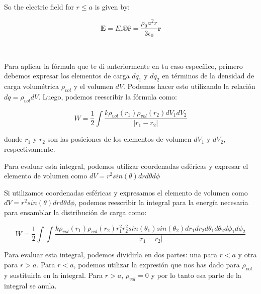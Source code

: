 So the electric field for $r \leq a$ is given by:

$$ \mathbf{E} = E_r®\hat{\mathbf{r}} = \frac{\rho_0 a^2 r}{3 \epsilon_0}\hat{\mathbf{r}} $$

------------------------------------


Para aplicar la fórmula que te di anteriormente en tu caso específico, primero debemos expresar los elementos de carga $dq_1$ y $dq_2$ en términos de la densidad de carga volumétrica $\rho_{vol}$ y el volumen $dV$. Podemos hacer esto utilizando la relación $dq = \rho_{vol} dV$. Luego, podemos reescribir la fórmula como:

$$ W = \frac{1}{2} \int \frac{k \rho_{vol}(r_1) \rho_{vol}(r_2) dV_1 dV_2}{|r_1 - r_2|} $$

donde $r_1$ y $r_2$ son las posiciones de los elementos de volumen $dV_1$ y $dV_2$, respectivamente.

Para evaluar esta integral, podemos utilizar coordenadas esféricas y expresar el elemento de volumen como $dV = r^2 sin(\theta) dr d\theta d\phi$


Si utilizamos coordenadas esféricas y expresamos el elemento de volumen como $dV = r^2 sin(\theta) dr d\theta d\phi$, podemos reescribir la integral para la energía necesaria para ensamblar la distribución de carga como:

$$ W = \frac{1}{2} \int \int \frac{k \rho_{vol}(r_1) \rho_{vol}(r_2) r_1^2 r_2^2 sin(\theta_1) sin(\theta_2) dr_1 dr_2 d\theta_1 d\theta_2 d\phi_1 d\phi_2}{|r_1 - r_2|} $$

Para evaluar esta integral, podemos dividirla en dos partes: una para $r<a$ y otra para $r>a$. Para $r<a$, podemos utilizar la expresión que nos has dado para $\rho_{vol}$ y sustituirla en la integral. Para $r>a$, $\rho_{vol} = 0$ y por lo tanto esa parte de la integral se anula.
%
%


